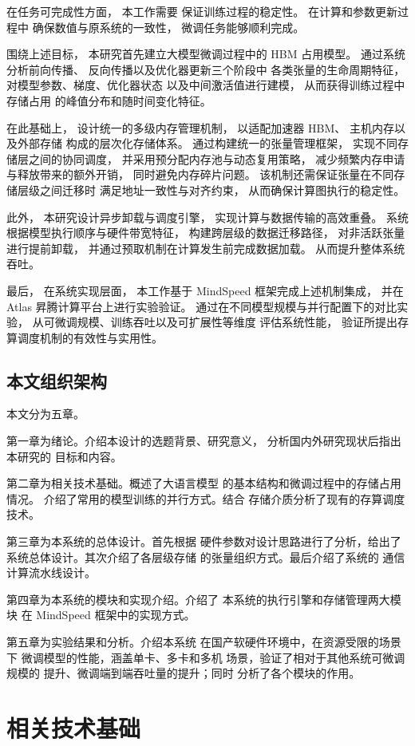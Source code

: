 \documentclass[bachelor,openany,oneside,color,AutoFakeBold=true]{buaathesis}
\begin{document}
在任务可完成性方面，
本工作需要
保证训练过程的稳定性。
在计算和参数更新过程中
确保数值与原系统的一致性，
微调任务能够顺利完成。

围绕上述目标，
本研究首先建立大模型微调过程中的
 HBM 占用模型。
通过系统分析前向传播、
反向传播以及优化器更新三个阶段中
各类张量的生命周期特征，
对模型参数、梯度、优化器状态
以及中间激活值进行建模，
从而获得训练过程中存储占用
的峰值分布和随时间变化特征。

在此基础上，
设计统一的多级内存管理机制，
以适配加速器 HBM、
主机内存以及外部存储
构成的层次化存储体系。
通过构建统一的张量管理框架，
实现不同存储层之间的协同调度，
并采用预分配内存池与动态复用策略，
减少频繁内存申请与释放带来的额外开销，
同时避免内存碎片问题。
该机制还需保证张量在不同存储层级之间迁移时
满足地址一致性与对齐约束，
从而确保计算图执行的稳定性。

此外，
本研究设计异步卸载与调度引擎，
实现计算与数据传输的高效重叠。
系统根据模型执行顺序与硬件带宽特征，
构建跨层级的数据迁移路径，
对非活跃张量进行提前卸载，
并通过预取机制在计算发生前完成数据加载。
从而提升整体系统吞吐。

最后，
在系统实现层面，
本工作基于 MindSpeed 框架完成上述机制集成，
并在 Atlas 昇腾计算平台上进行实验验证。
通过在不同模型规模与并行配置下的对比实验，
从可微调规模、训练吞吐以及可扩展性等维度
评估系统性能，
验证所提出存算调度机制的有效性与实用性。

\section{本文组织架构}
本文分为五章。

第一章为绪论。介绍本设计的选题背景、研究意义，
分析国内外研究现状后指出本研究的
目标和内容。

第二章为相关技术基础。概述了大语言模型
的基本结构和微调过程中的存储占用情况。
介绍了常用的模型训练的并行方式。结合
存储介质分析了现有的存算调度技术。

第三章为本系统的总体设计。首先根据
硬件参数对设计思路进行了分析，给出了
系统总体设计。其次介绍了各层级存储
的张量组织方式。最后介绍了系统的
通信计算流水线设计。

第四章为本系统的模块和实现介绍。介绍了
本系统的执行引擎和存储管理两大模块
在 MindSpeed 框架中的实现方式。

第五章为实验结果和分析。介绍本系统
在国产软硬件环境中，在资源受限的场景下
微调模型的性能，涵盖单卡、多卡和多机
场景，验证了相对于其他系统可微调规模的
提升、微调端到端吞吐量的提升；同时
分析了各个模块的作用。

\chapter{相关技术基础}
\end{document}

